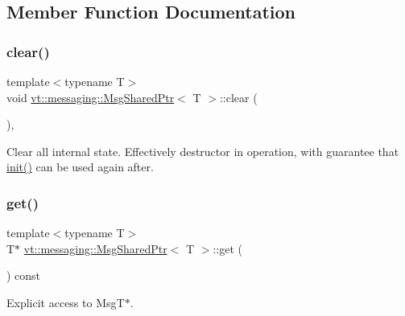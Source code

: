 \subsection{Member Function Documentation}
\mbox{\label{structvt_1_1messaging_1_1_msg_shared_ptr_ace4439c8585f3d3c50b861570db07d99}} 
\subsubsection{\texorpdfstring{clear()}{clear()}}
{\footnotesize\ttfamily template$<$typename T$>$ \\
void \hyperlink{structvt_1_1messaging_1_1_msg_shared_ptr}{vt\+::messaging\+::\+Msg\+Shared\+Ptr}$<$ T $>$\+::clear (\begin{DoxyParamCaption}{ }\end{DoxyParamCaption})\hspace{0.3cm}{\ttfamily [inline]}, {\ttfamily [private]}}

Clear all internal state. Effectively destructor in operation, with guarantee that \hyperlink{structvt_1_1messaging_1_1_msg_shared_ptr_a7117c1a8364c3267d4694b79a2f5cc6b}{init()} can be used again after. \mbox{\label{structvt_1_1messaging_1_1_msg_shared_ptr_a6e6e25e087e662d9171fa20b5092efdd}} 
\subsubsection{\texorpdfstring{get()}{get()}}
{\footnotesize\ttfamily template$<$typename T$>$ \\
T$\ast$ \hyperlink{structvt_1_1messaging_1_1_msg_shared_ptr}{vt\+::messaging\+::\+Msg\+Shared\+Ptr}$<$ T $>$\+::get (\begin{DoxyParamCaption}{ }\end{DoxyParamCaption}) const\hspace{0.3cm}{\ttfamily [inline]}}



Explicit access to Msg\+T$\ast$. 

